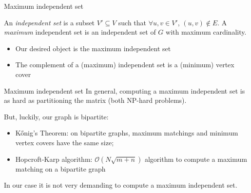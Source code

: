 \begin{frame}{Maximum independent set}
 \begin{definition}
		An \emph{independent set} is a subset $V' \subseteq V$ such that $ \forall u,v \in V'$, $(u,v) \notin E$.
	A \emph{maximum} independent set is an independent set of $G$ with maximum cardinality. 
 \end{definition}

\begin{itemize}\itemsep=0.3cm
	\item Our desired object is the maximum independent set
	\item The complement of a (maximum) independent set is a (minimum) vertex cover
\end{itemize}

\end{frame}

\begin{frame}{Maximum independent set}
	In general, computing a maximum independent set is as hard as partitioning the matrix (both NP-hard problems).

But, luckily, our graph is bipartite:

	\begin{itemize}\itemsep=0.3cm
		\item K\H{o}nig's Theorem: on bipartite graphs, maximum matchings and minimum vertex covers have the same size;
		\item Hopcroft-Karp algorithm: $\mathcal{O}\left(N\sqrt{m+n}\right)$ algorithm to compute a maximum matching on a bipartite graph
	\end{itemize}

In our case it is not very demanding to compute a maximum independent set.

\end{frame}

